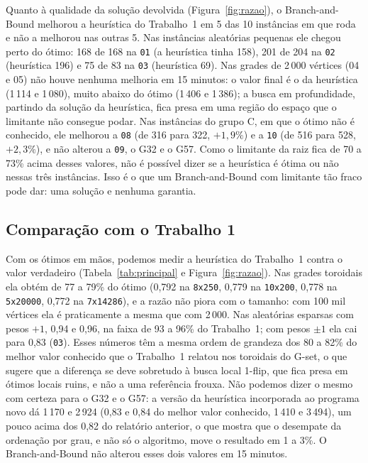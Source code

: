Quanto à qualidade da solução devolvida (Figura~\ref{fig:razao}), o Branch-and-Bound melhorou a heurística do Trabalho~1 em 5 das 10 instâncias em que roda e não a melhorou nas outras 5. Nas instâncias aleatórias pequenas ele chegou perto do ótimo: 168 de 168 na \texttt{01} (a heurística tinha 158), 201 de 204 na \texttt{02} (heurística 196) e 75 de 83 na \texttt{03} (heurística 69). Nas grades de 2\,000 vértices (04 e 05) não houve nenhuma melhoria em 15 minutos: o valor final é o da heurística (1\,114 e 1\,080), muito abaixo do ótimo (1\,406 e 1\,386); a busca em profundidade, partindo da solução da heurística, fica presa em uma região do espaço que o limitante não consegue podar. Nas instâncias do grupo C, em que o ótimo não é conhecido, ele melhorou a \texttt{08} (de 316 para 322, $+1{,}9\%$) e a \texttt{10} (de 516 para 528, $+2{,}3\%$), e não alterou a \texttt{09}, o G32 e o G57. Como o limitante da raiz fica de 70 a 73\% acima desses valores, não é possível dizer se a heurística é ótima ou não nessas três instâncias. Isso é o que um Branch-and-Bound com limitante tão fraco pode dar: uma solução e nenhuma garantia.

\subsection{Comparação com o Trabalho 1}

Com os ótimos em mãos, podemos medir a heurística do Trabalho~1 contra o valor verdadeiro (Tabela~\ref{tab:principal} e Figura~\ref{fig:razao}). Nas grades toroidais ela obtém de 77 a 79\% do ótimo (0,792 na \texttt{8x250}, 0,779 na \texttt{10x200}, 0,778 na \texttt{5x20000}, 0,772 na \texttt{7x14286}), e a razão não piora com o tamanho: com 100 mil vértices ela é praticamente a mesma que com 2\,000. Nas aleatórias esparsas com pesos $+1$, 0,94 e 0,96, na faixa de 93 a 96\% do Trabalho~1; com pesos $\pm1$ ela cai para 0,83 (\texttt{03}). Esses números têm a mesma ordem de grandeza dos 80 a 82\% do melhor valor conhecido que o Trabalho~1 relatou nos toroidais do G-set, o que sugere que a diferença se deve sobretudo à busca local 1-flip, que fica presa em ótimos locais ruins, e não a uma referência frouxa. Não podemos dizer o mesmo com certeza para o G32 e o G57: a versão da heurística incorporada ao programa novo dá 1\,170 e 2\,924 (0,83 e 0,84 do melhor valor conhecido, 1\,410 e 3\,494), um pouco acima dos 0,82 do relatório anterior, o que mostra que o desempate da ordenação por grau, e não só o algoritmo, move o resultado em 1 a 3\%. O Branch-and-Bound não alterou esses dois valores em 15 minutos.

